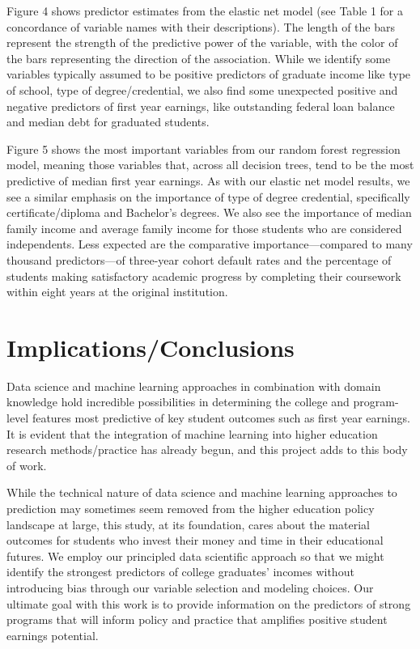 \documentclass[a4paper, 12pt]{article}
\begin{document}
Figure 4 shows predictor estimates from the elastic net model (see
Table 1 for a concordance of variable names with their
descriptions). The length of the bars represent the strength of the
predictive power of the variable, with the color of the bars
representing the direction of the association. While we identify some
variables typically assumed to be positive predictors of graduate
income like type of school, type of degree/credential, we also find
some unexpected positive and negative predictors of first year
earnings, like outstanding federal loan balance and median debt for
graduated students.

Figure 5 shows the most important variables from our random forest
regression model, meaning those variables that, across all decision
trees, tend to be the most predictive of median first year
earnings. As with our elastic net model results, we see a similar
emphasis on the importance of type of degree credential, specifically
certificate/diploma and Bachelor's degrees. We also see the importance
of median family income and average family income for those students
who are considered independents. Less expected are the comparative
importance---compared to many thousand predictors---of three-year
cohort default rates and the percentage of students making
satisfactory academic progress by completing their coursework within
eight years at the original institution.

\section*{Implications/Conclusions}

Data science and machine learning approaches in combination with
domain knowledge hold incredible possibilities in determining the
college and program-level features most predictive of key student
outcomes such as first year earnings. It is evident that the
integration of machine learning into higher education research
methods/practice has already begun, and this project adds to this body
of work.

While the technical nature of data science and machine learning
approaches to prediction may sometimes seem removed from the higher
education policy landscape at large, this study, at its foundation,
cares about the material outcomes for students who invest their money
and time in their educational futures. We employ our principled data
scientific approach so that we might identify the strongest predictors
of college graduates' incomes without introducing bias through our
variable selection and modeling choices. Our ultimate goal with this
work is to provide information on the predictors of strong programs
that will inform policy and practice that amplifies positive student
earnings potential.

\pagebreak
{}
\setlength{} 
\printbibliography
\end{document}
